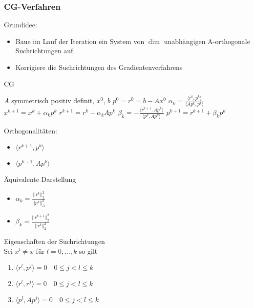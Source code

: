 \subsubsection{CG-Verfahren}
Grundidee:
\begin{itemize}
	\item Baue im Lauf der Iteration ein System von $\dim$ unabhängigen A-orthogonale Suchrichtungen auf.
	\item Korrigiere die Suchrichtungen des Gradientenverfahrens
\end{itemize}

\begin{algorithm}
	\caption{CG}
	\begin{algorithmic}
		\STATE $A$ symmetrisch positiv definit, $x^{0}$, $b$
		\STATE $p^{0} = r^{0} = b- Ax^{0}$
			\STATE $\alpha_{k}=\frac{\langle r^{k},p^{k}\rangle}{\langle A p^{k},p^{k}\rangle}$
			\STATE $x^{k+1} =  x^{k} + \alpha_{k} p^{k}$
			\STATE $r^{k+1} = r^{k} - \alpha_{k}Ap^{k}$
			\STATE $\beta_{k} = - \frac{\langle r^{k+1},Ap^{k}\rangle}{\langle p^{k},Ap^{k}\rangle}$
			\STATE $p^{k+1} = r^{k+1} + \beta_{k}p^{k}$
		\ENDFOR
	\end{algorithmic}
\end{algorithm}

\begin{remark}
	Orthogonalitäten:
	\begin{itemize}
		\item $\langle r^{k+1}, p^{k}\rangle$
		\item $\langle p^{k+1},Ap^{k}\rangle$
	\end{itemize}
\end{remark}

\begin{theorem}
	Äquivalente Darstellung
	\\
	\begin{itemize}
		\item $\alpha_{k}=\frac{||r^{k}||_{2}^{2}}{||p^{k}||_{A}^{2}}$
		\item $\beta_{k} = \frac{||r^{k+1}||^{2}_{2}}{||r^{k}||^{2}_{2}}$
	\end{itemize}
\end{theorem}


\begin{theorem}
	Eigenschaften der Suchrichtungen
	\\
	Sei $x^{l}\not = x$ für $l=0,\ldots,k$ so gilt
	\begin{enumerate}
		\item $\langle r^{l},p^{j}\rangle=0\quad 0\leq j<l\leq k$
		\item $\langle r^{l},r^{j}\rangle=0\quad 0\leq j<l\leq k$
		\item $\langle p^{l},Ap^{j}\rangle =0 \quad 0\leq j<l\leq k$
	\end{enumerate}
\end{theorem}


